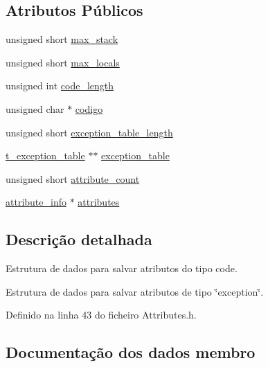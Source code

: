 \subsection*{Atributos Públicos}
\begin{DoxyCompactItemize}
\item 
unsigned short \hyperlink{structcode__attribute_ad8f0d9ec65c9065df510fb7313133eb0}{max\+\_\+stack}
\item 
unsigned short \hyperlink{structcode__attribute_aa5c39f7692d14498f497ac2425595dda}{max\+\_\+locals}
\item 
unsigned int \hyperlink{structcode__attribute_a8d9bb88d00f7285dbad08ec687adfd2c}{code\+\_\+length}
\item 
unsigned char $\ast$ \hyperlink{structcode__attribute_a34d2f27374b7101b524e178078c15a98}{codigo}
\item 
unsigned short \hyperlink{structcode__attribute_a52263ac885da86196b36a51e7ee5bd6e}{exception\+\_\+table\+\_\+length}
\item 
\hyperlink{structt__exception__table}{t\+\_\+exception\+\_\+table} $\ast$$\ast$ \hyperlink{structcode__attribute_a7d1657d4edf179c1596f9c102a887b3e}{exception\+\_\+table}
\item 
unsigned short \hyperlink{structcode__attribute_af71546c75dc3185e14b8cd5eb8cd6a24}{attribute\+\_\+count}
\item 
\hyperlink{structattribute__info}{attribute\+\_\+info} $\ast$ \hyperlink{structcode__attribute_a9f45491da8c177e471b75c9539bb37b2}{attributes}
\end{DoxyCompactItemize}


\subsection{Descrição detalhada}
Estrutura de dados para salvar atributos do tipo code. 

Estrutura de dados para salvar atributos de tipo \char`\"{}exception\char`\"{}. 

Definido na linha 43 do ficheiro Attributes.\+h.



\subsection{Documentação dos dados membro}
\mbox{\label{structcode__attribute_af71546c75dc3185e14b8cd5eb8cd6a24}} 
